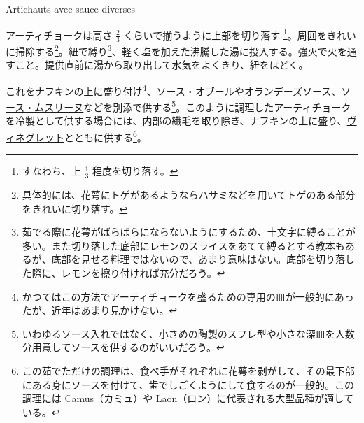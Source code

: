 \begin{recette}
\begin{frsubenv}
Artichauts avec sauce diverses

\end{frsubenv}


アーティチョークは高さ \(\frac{2}{3}\) くらいで揃うように上部を切り落す
\footnote{すなわち、上 \(\frac{1}{3}\) 程度を切り落す。}。周囲をきれいに掃除する\footnote{具体的には、花萼にトゲがあるようならハサミなどを用いてトゲのある部分をきれいに切り落す。}。紐で縛り\footnote{茹でる際に花萼がばらばらにならないようにするため、十文字に縛ることが多い。また切り落した底部にレモンのスライスをあてて縛るとする教本もあるが、底部を見せる料理ではないので、あまり意味はない。底部を切り落した際に、レモンを擦り付ければ充分だろう。}、軽く塩を加えた沸騰した湯に投入する。強火で火を通すこと。提供直前に湯から取り出して水気をよくきり、紐をほどく。

これをナフキンの上に盛り付け\footnote{かつてはこの方法でアーティチョークを盛るための専用の皿が一般的にあったが、近年はあまり見かけない。}、\protect\hyperlink{sauce-au-beurre}{ソース・オブール}や\protect\hyperlink{sauce-hollandaise}{オランデーズソース}、\protect\hyperlink{sauce-mousseline}{ソース・ムスリーヌ}などを別添で供する\footnote{いわゆるソース入れではなく、小さめの陶製のスフレ型や小さな深皿を人数分用意してソースを供するのがいいだろう。}。このように調理したアーティチョークを冷製として供する場合には、内部の繊毛を取り除き、ナフキンの上に盛り、\protect\hyperlink{vinaigrette}{ヴィネグレット}とともに供する\footnote{この茹でただけの調理は、食べ手がそれぞれに花萼を剥がして、その最下部にある身にソースを付けて、歯でしごくようにして食するのが一般的。この調理には
  Camus（カミュ）や Laon（ロン）に代表される大型品種が適している。}。

\atoaki{}

\hypertarget{artichauts-a-la-provencale}{%
}
\end{recette}
